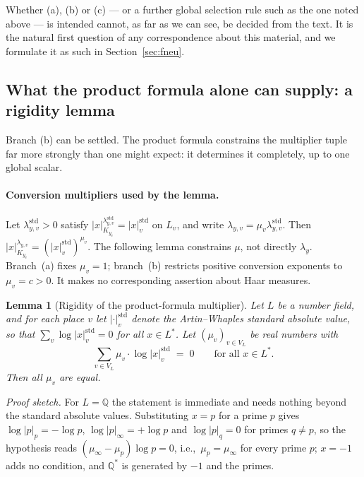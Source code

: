\documentclass[11pt,a4paper]{article}
\theoremstyle{definition}
\theoremstyle{plain}
\newtheorem{lemmaR}{Lemma}
\theoremstyle{definition}
\begin{document}
Whether (a), (b) or (c) --- or a further global selection rule such as the one
noted above --- is intended cannot, as far as we can see, be decided from the
text. It is the natural first question of any correspondence about this material,
and we formulate it as such in Section~\ref{sec:fneu}.

\subsection{What the product formula alone can supply: a rigidity lemma}
\label{sec:rigidity}

Branch (b) can be settled. The product formula constrains the multiplier tuple far
more strongly than one might expect: it determines it completely, up to one global
scalar.

\paragraph{Conversion multipliers used by the lemma.}
Let $\lambda^{\mathrm{std}}_{y,v}>0$ satisfy
$|x|_{K_{y_v}}^{\lambda^{\mathrm{std}}_{y,v}}=|x|^{\mathrm{std}}_v$ on $L_v$,
and write $\lambda_{y,v}=\mu_v\lambda^{\mathrm{std}}_{y,v}$.
Then $|x|_{K_{y_v}}^{\lambda_{y,v}}=(|x|^{\mathrm{std}}_v)^{\mu_v}$.
The following lemma constrains $\mu$, not directly $\lambda_y$.
Branch~(a) fixes $\mu_v=1$; branch~(b) restricts positive conversion exponents
to $\mu_v=c>0$. It makes no corresponding assertion about Haar measures.

\begin{lemmaR}[Rigidity of the product-formula multiplier]
\label{lem:rigidity}
Let $L$ be a number field, and for each place $v$ let $|\cdot|^{\mathrm{std}}_v$
denote the Artin--Whaples standard absolute value, so that
$\sum_v \log|x|^{\mathrm{std}}_v = 0$ for all $x \in L^*$. Let
$(\mu_v)_{v \in V_L}$ be real numbers with
\[
  \sum_{v \in V_L} \mu_v \cdot \log|x|^{\mathrm{std}}_v \;=\; 0
  \qquad \text{for all } x \in L^*.
\]
Then all $\mu_v$ are equal.
\end{lemmaR}

\noindent\emph{Proof sketch.}
For $L = \mathbb{Q}$ the statement is immediate and needs nothing beyond the
standard absolute values. Substituting $x = p$ for a prime $p$ gives
$\log|p|_p = -\log p$, $\log|p|_\infty = +\log p$ and $\log|p|_q = 0$ for primes
$q \neq p$, so the hypothesis reads $(\mu_\infty - \mu_p)\log p = 0$, i.e.,\
$\mu_p = \mu_\infty$ for every prime $p$; $x = -1$ adds no condition, and
$\mathbb{Q}^*$ is generated by $-1$ and the primes.
\end{document}
